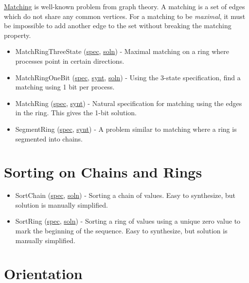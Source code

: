 \href{http://en.wikipedia.org/wiki/Matching_(graph_theory)}{Matching} is well-known problem from graph theory.
A matching is a set of edges which do not share any common vertices.
For a matching to be \textit{maximal}, it must be impossible to add another edge to the set without breaking the matching property.
\begin{itemize}
\item MatchRingThreeState (\href{\examplespec/MatchRingThreeState.prot}{spec}, \href{\examplesoln/MatchRingThreeState.prot}{soln})
- Maximal matching on a ring where processes point in certain directions.
\item MatchRingOneBit (\href{\examplespec/MatchRingOneBit.prot}{spec}, \href{\examplesynt/MatchRingOneBit.prot}{synt}, \href{\examplesoln/MatchRingOneBit.prot}{soln})
- Using the 3-state specification, find a matching using 1 bit per process.
\item MatchRing (\href{\examplespec/MatchRing.prot}{spec}, \href{\examplesynt/MatchRing.prot}{synt})
- Natural specification for matching using the edges in the ring.
This gives the 1-bit solution.
\item SegmentRing (\href{\examplespec/SegmentRing.prot}{spec}, \href{\examplesynt/SegmentRing.prot}{synt})
- A problem similar to matching where a ring is segmented into chains.
\end{itemize}

\section{Sorting on Chains and Rings}

\begin{itemize}
\item SortChain (\href{\examplespec/SortChain.prot}{spec}, \href{\examplesoln/SortChain.prot}{soln})
- Sorting a chain of values.
Easy to synthesize, but solution is manually simplified.
\item SortRing (\href{\examplespec/SortRing.prot}{spec}, \href{\examplesoln/SortRing.prot}{soln})
- Sorting a ring of values using a unique zero value to mark the beginning of the sequence.
Easy to synthesize, but solution is manually simplified.
\end{itemize}

\section{Orientation}

